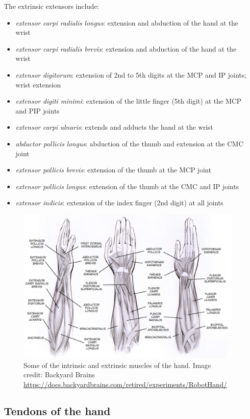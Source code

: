 \documentclass{article}
\begin{document}
The extrinsic extensors include:

\begin{itemize}
\item \textit{extensor carpi radialis longus}: extension and abduction of the hand at the wrist
\item \textit{extensor carpi radialis brevis}: extension and abduction of the hand at the wrist
\item \textit{extensor digitorum}: extension of 2nd to 5th digits at the MCP and IP joints; wrist extension
\item \textit{extensor digiti minimi}: extension of the little finger (5th digit) at the MCP and PIP joints
\item \textit{extensor carpi ulnaris}: extends and adducts the hand at the wrist
\item \textit{abductor pollicis longus}: abduction of the thumb and extension at the CMC joint
\item \textit{extensor pollicis brevis}: extension of the thumb at the MCP joint
\item \textit{extensor pollicis longus}: extension of the thumb at the CMC and IP joints
\item \textit{extensor indicis}: extension of the index finger (2nd digit) at all joints
\end{itemize}

\begin{figure}[!htbp]
\centering
\includegraphics[width=0.7\linewidth]{files/EPpXta8zJdzN048lz8AR-7a67f58c3616b210fcf078d1714aa2fb.png}
\caption[]{Some of the intrinsic and extrinsic muscles of the hand. Image credit: Backyard Brains \href{https://docs.backyardbrains.com/retired/experiments/RobotHand/}{https://docs.backyardbrains.com/retired/experiments/RobotHand/}}
\label{f1XadeuWyO}
\end{figure}

\subsection{Tendons of the hand}
\end{document}

